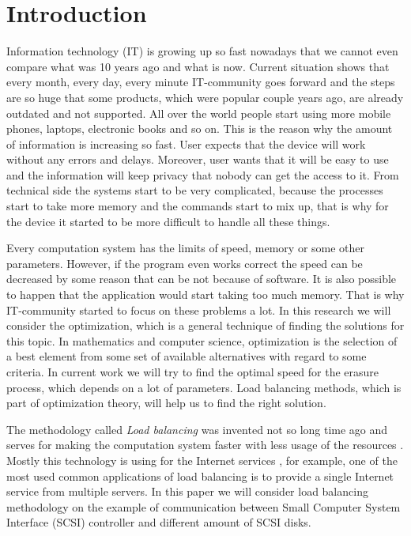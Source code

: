 \chapter{Introduction}
\label{chap1:title}

Information technology (IT) is growing up so fast nowadays that we cannot even compare what was 10 years ago and what is now. Current situation shows that every month, every day, every minute IT-community goes forward and the steps are so huge that some products, which were popular couple years ago, are already outdated and not supported. All over the world people start using more mobile phones, laptops, electronic books and so on. This is the reason why the amount of information is increasing so fast. User expects that the device will work without any errors and delays. Moreover, user wants that it will be easy to use and the information will keep privacy that nobody can get the access to it. From technical side the systems start to be very complicated, because the processes start to take more memory and the commands start to mix up, that is why for the device it started to be more difficult to handle all these things. 

Every computation system has the limits of speed, memory or some other parameters. However, if the program even works correct the speed can be decreased by some reason that can be not because of software. It is also possible to happen that the application would start taking too much memory. That is why IT-community started to focus on these problems a lot. In this research we will consider the optimization, which is a general technique of finding the solutions for this topic. In mathematics and computer science, optimization is the selection of a best element from some set of available alternatives with regard to some criteria. In current work we will try to find the optimal speed for the erasure process, which depends on a lot of parameters. Load balancing methods, which is part of optimization theory, will help us to find the right solution.

The methodology called \emph{Load balancing} was invented not so long time ago and serves for making the computation system faster with less usage of the resources \cite{load_bal}. Mostly this technology is using for the Internet services \cite{dyn_bal_web}, for example, one of the most used common applications of load balancing is to provide a single Internet service from multiple servers. In this paper we will consider load balancing methodology on the example of communication between Small Computer System Interface (SCSI) controller and different amount of SCSI disks. 

